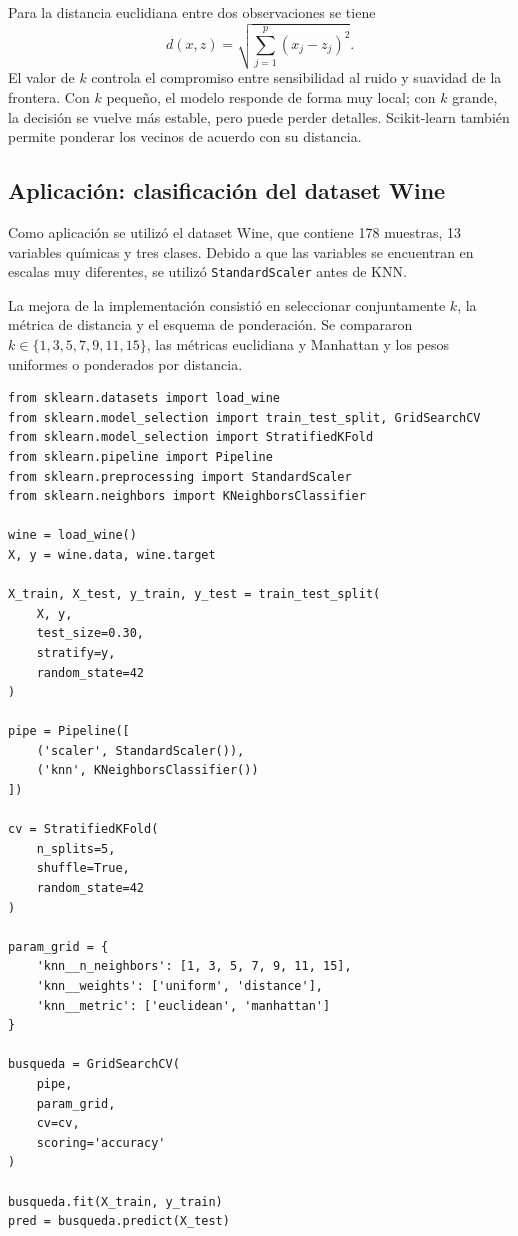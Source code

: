 \documentclass[14pt,twoside]{article}
\begin{document}
Para la distancia euclidiana entre dos observaciones se tiene
\[
d(x,z)=\sqrt{\sum_{j=1}^{p}(x_j-z_j)^2}.
\]
El valor de $k$ controla el compromiso entre sensibilidad al ruido y suavidad de la frontera. Con $k$ pequeño, el modelo responde de forma muy local; con $k$ grande, la decisión se vuelve más estable, pero puede perder detalles. Scikit-learn también permite ponderar los vecinos de acuerdo con su distancia. \cite{sklearnNeighbors}

\subsection{Aplicación: clasificación del dataset Wine}

Como aplicación se utilizó el dataset Wine, que contiene 178 muestras, 13 variables químicas y tres clases. Debido a que las variables se encuentran en escalas muy diferentes, se utilizó \texttt{StandardScaler} antes de KNN.

La mejora de la implementación consistió en seleccionar conjuntamente $k$, la métrica de distancia y el esquema de ponderación. Se compararon $k\in\{1,3,5,7,9,11,15\}$, las métricas euclidiana y Manhattan y los pesos uniformes o ponderados por distancia.

\begin{lstlisting}[style=pgpython,caption={Implementación mejorada de KNN.}]
from sklearn.datasets import load_wine
from sklearn.model_selection import train_test_split, GridSearchCV
from sklearn.model_selection import StratifiedKFold
from sklearn.pipeline import Pipeline
from sklearn.preprocessing import StandardScaler
from sklearn.neighbors import KNeighborsClassifier

wine = load_wine()
X, y = wine.data, wine.target

X_train, X_test, y_train, y_test = train_test_split(
    X, y,
    test_size=0.30,
    stratify=y,
    random_state=42
)

pipe = Pipeline([
    ('scaler', StandardScaler()),
    ('knn', KNeighborsClassifier())
])

cv = StratifiedKFold(
    n_splits=5,
    shuffle=True,
    random_state=42
)

param_grid = {
    'knn__n_neighbors': [1, 3, 5, 7, 9, 11, 15],
    'knn__weights': ['uniform', 'distance'],
    'knn__metric': ['euclidean', 'manhattan']
}

busqueda = GridSearchCV(
    pipe,
    param_grid,
    cv=cv,
    scoring='accuracy'
)

busqueda.fit(X_train, y_train)
pred = busqueda.predict(X_test)
\end{lstlisting}
\end{document}
